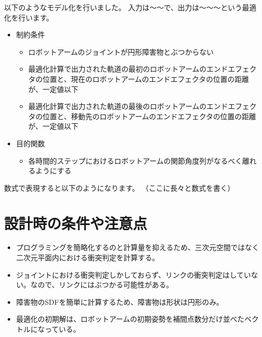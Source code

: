 以下のようなモデル化を行いました。
入力は〜〜で、出力は〜〜〜という最適化を行います。

\begin{itemize}
  \item 制約条件
  \begin{itemize}
    \item ロボットアームのジョイントが円形障害物とぶつからない
    \item 最適化計算で出力された軌道の最初のロボットアームのエンドエフェクタの位置と、現在のロボットアームのエンドエフェクタの位置の距離が、一定値以下
    \item 最適化計算で出力された軌道の最後のロボットアームのエンドエフェクタの位置と、移動先のロボットアームのエンドエフェクタの位置の距離が、一定値以下
  \end{itemize}

  \item 目的関数
    \begin{itemize}
      \item 各時間的ステップにおけるロボットアームの関節角度列がなるべく離れるようにする
    \end{itemize}
\end{itemize}

数式で表現すると以下のようになります。
（ここに長々と数式を書く）

\section{設計時の条件や注意点}
\begin{itemize}
  \item プログラミングを簡略化するのと計算量を抑えるため、三次元空間ではなく二次元平面内における衝突判定を計算する。
  \item ジョイントにおける衝突判定しかしておらず、リンクの衝突判定はしていない。なので、リンクにはぶつかる可能性がある。
  \item 障害物のSDFを簡単に計算するため、障害物は形状は円形のみ。
  \item 最適化の初期解は、ロボットアームの初期姿勢を補間点数分だけ並べたベクトルになっている。
\end{itemize}
